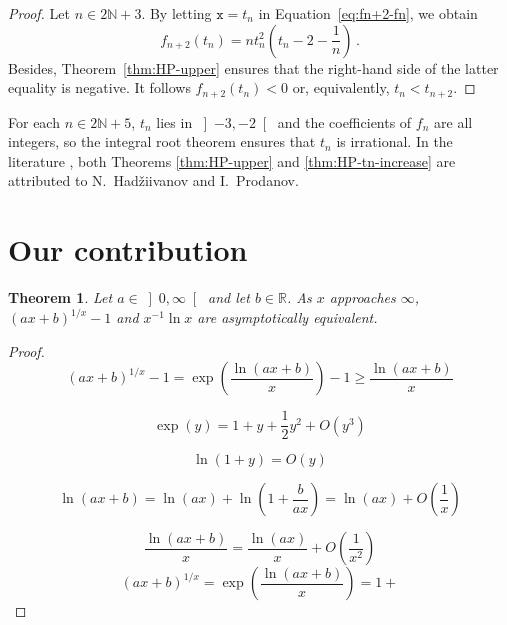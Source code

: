 \documentclass[12pt]{article}
\newcommand{\bR}{\mathbb{R}}
\newcommand{\bN}{\mathbb{N}}
\newcommand{\gtint}[1]{\left] #1, \infty \right[}
\newcommand{\ttx}{\mathtt{x}}
\newtheorem{theorem}{Theorem}
\begin{document}
 \begin{proof}
 Let $n \in 2 \bN + 3$.
 By letting $\ttx = t_n$ in Equation~\eqref{eq:fn+2-fn}, we obtain
 $$ 
f_{n + 2} (t_n) = n t_n^2 \left(t_n - 2 - \frac{1}{n} \right) \, .
$$
Besides, Theorem~\ref{thm:HP-upper} ensures that the right-hand side of the latter equality is negative.
It follows $f_{n + 2} (t_n) < 0$ or, equivalently, $t_n < t_{n + 2}$.
\end{proof}

For each $n \in 2 \bN + 5$, $t_n$ lies in $\left]- 3, - 2 \right[$ and the coefficients of $f_n$ are all integers,
so the integral root theorem ensures that $t_n$ is irrational.
 In the literature \cite{MitrinovicCNIA, MitrinovicAI, MitrinovicP93, MondP94},
 both Theorems \ref{thm:HP-upper} and \ref{thm:HP-tn-increase} are attributed to N.~Had\v{z}iivanov and I.~Prodanov.

\section{Our contribution}

\begin{theorem}
  Let $a \in \gtint{0}$ and let $b \in \bR$.
 As $x$ approaches $\infty$, 
 ${(a x + b)}^{1 / x} - 1$
 and
 $x^{-1} \ln x$ are asymptotically equivalent.
\end{theorem}

\begin{proof}
  
  $$
  {(a x + b)}^{1 / x} - 1 = \exp \left( \frac{\ln (a x + b)}{x} \right) - 1 \ge   \frac{\ln (a x + b)}{x} 
  $$
  
  $$
  \exp(y) = 1 + y + \frac{1}{2} y^2 + O(y^3)  
  $$

  $$
  \ln(1 + y) = O(y) 
  $$

  $$
  \ln(a x + b) = \ln (a x) + \ln \left(1 +  \frac{b}{a x} \right) = \ln(a x) + O \left( \frac{1} {x} \right)
  $$

  $$
   \frac{\ln(ax + b)}{x} = \frac{\ln(a x)}{x} + O \left( \frac{1}{x^2} \right)
  $$
  $$
  {(a x + b)}^{1 / x} = \exp \left( \frac{\ln( a x + b)}{x}  \right) = 1 + 
  $$
\end{proof} 
\end{document}
